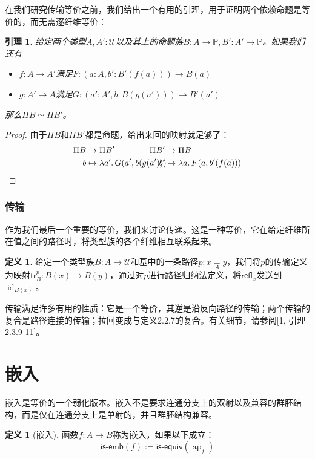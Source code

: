\documentclass{ctexrep}
\theoremstyle{plain}
\newtheorem{lemma}[theorem]{引理}
\theoremstyle{definition}
\newtheorem{definition}[theorem]{定义}
\theoremstyle{remark}
\theoremstyle{definition}
\theoremstyle{definition}
\theoremstyle{definition}
\newcommand{\coloneqq}{\mathrel{:=}}
\newcommand{\ap}{\operatorname{ap}}
\newcommand{\tr}{\mathsf{tr}}
\newcommand{\refl}{\mathsf{refl}}
\newcommand{\id}{\operatorname{id}}
\newcommand{\isembed}{\mathsf{is\text{-}emb}}
\newcommand{\isequiv}{\mathsf{is\text{-}equiv}}
\newcommand{\UU}{\mathcal{U}}
\begin{document}
在我们研究传输等价之前，我们给出一个有用的引理，用于证明两个依赖命题是等价的，而无需逐纤维等价：

\begin{lemma}
给定两个类型$A,A':\UU$以及其上的命题族$B:A\to\mathbb{P}, B':A'\to\mathbb{P}$。如果我们还有
\begin{itemize}
    \item $f:A\to A'$满足$F:(a:A,b':B'(f(a)))\to B(a)$
    \item $g:A'\to A$满足$G:(a':A',b:B(g(a')))\to B'(a')$
\end{itemize}
那么$\Pi B \simeq \Pi B'$。
\end{lemma}

\begin{proof}
由于$\Pi B$和$\Pi B'$都是命题，给出来回的映射就足够了：
\begin{align*}
\Pi B &\to \Pi B' &\hspace{-3em} \Pi B' &\to \Pi B \\
b &\mapsto \lambda a'.\,G(a',b(g(a'))) &\hspace{-3em} b' &\mapsto \lambda a.\,F(a,b'(f(a)))
\end{align*}
\end{proof}

\subsubsection{传输}

作为我们最后一个重要的等价，我们来讨论传递。这是一种等价，它在给定纤维所在值之间的路径时，将类型族的各个纤维相互联系起来。

\begin{definition}
给定一个类型族$B:A\to\UU$和基中的一条路径$p:x\underset{A}{=} y$，我们将$p$的传输定义为映射$\tr_B^p:B(x)\to B(y)$，通过对$p$进行路径归纳法定义，将$\refl_x$发送到$\id_{B(x)}$。
\end{definition}

传输满足许多有用的性质：它是一个等价，其逆是沿反向路径的传输；两个传输的复合是路径连接的传输；拉回变成与定义2.2.7的复合。有关细节，请参阅[1, 引理2.3.9-11]。

\section{嵌入}

嵌入是等价的一个弱化版本。嵌入不是要求连通分支上的双射以及兼容的群胚结构，而是仅在连通分支上是单射的，并且群胚结构兼容。

\begin{definition}[嵌入]
函数$f:A\to B$称为嵌入，如果以下成立：
\[
\isembed(f)\coloneqq \isequiv(\ap_f)
\]
\end{definition}
\end{document}
